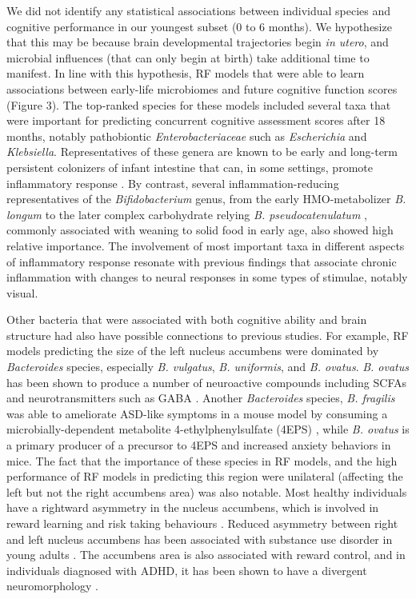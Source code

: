 \documentclass{article}
\begin{document}
We did not identify any statistical associations between individual species
and cognitive performance in our youngest subset (0 to 6 months).
We hypothesize that this may be because brain developmental trajectories
begin \textit{in utero}, and microbial influences (that can only begin at birth)
take additional time to manifest.
In line with this hypothesis, RF models that were able to learn associations
between early-life microbiomes and future cognitive function scores (Figure 3).
The top-ranked species for these models included several 
taxa that were important for predicting concurrent cognitive assessment scores after 18 months, notably
pathobiontic \textit{Enterobacteriaceae} such as
\textit{Escherichia} and \textit{Klebsiella}. 
Representatives of these genera are known to be early and long-term persistent
colonizers of infant intestine that can, in some settings,
promote inflammatory response \cite{popeEnterobacEarlyGut2019}.
By contrast, several inflammation-reducing representatives
of the \textit{Bifidobacterium} genus,
from the early HMO-metabolizer \textit{B. longum} to the
later complex carbohydrate relying \textit{B. pseudocatenulatum} \cite{chungBifidoPsudocatenulatum2021},
commonly associated with weaning to solid food in early age,
also showed high relative importance.
The involvement of most important taxa in different aspects of inflammatory response
resonate with previous findings that associate chronic inflammation with
changes to neural responses in some types of stimulae, notably visual\cite{xieChronicInfNeuro2019}.

Other bacteria that were associated with both cognitive ability and
brain structure had also have possible connections to previous studies.
For example, RF models predicting the size of the left nucleus accumbens
were dominated by \textit{Bacteroides} species,
especially \textit{B. vulgatus}, \textit{B. uniformis}, and \textit{B. ovatus}.
\textit{B. ovatus} has been shown to produce
a number of neuroactive compounds including SCFAs and neurotransmitters
such as GABA \cite{horvathBacteroidesOvatusColonization2022}.
Another \textit{Bacteroides} species, \textit{B. fragilis} was
able to ameliorate ASD-like symptoms in a mouse model
by consuming a microbially-dependent metabolite 4-ethylphenylsulfate (4EPS)
\cite{hsiaoMicrobiotaModulateBehavioral2013},
while \textit{B. ovatus} is a primary producer of a precursor to 4EPS
\cite{needhamGutderivedMetaboliteAlters2022} and increased anxiety
behaviors in mice.
The fact that the importance of these species in RF models,
and the high performance of RF models in predicting this region
were unilateral (affecting the left but not the right accumbens area)
was also notable. Most healthy individuals have a
rightward asymmetry in the nucleus accumbens,
which is involved in reward learning and risk taking behaviours
\cite{ernstAmygdalaNucleusAccumbens2005,yauNucleusAccumbensResponse2012}.
Reduced asymmetry between right and left nucleus accumbens
has been associated with substance use disorder in young adults
\cite{caoMappingCorticalSubcortical2021}. The accumbens area is also
associated with reward control, and in individuals diagnosed with ADHD,
it has been shown to have a divergent neuromorphology
\cite{hoogmanSubcorticalBrainVolume2017}.
\end{document}
